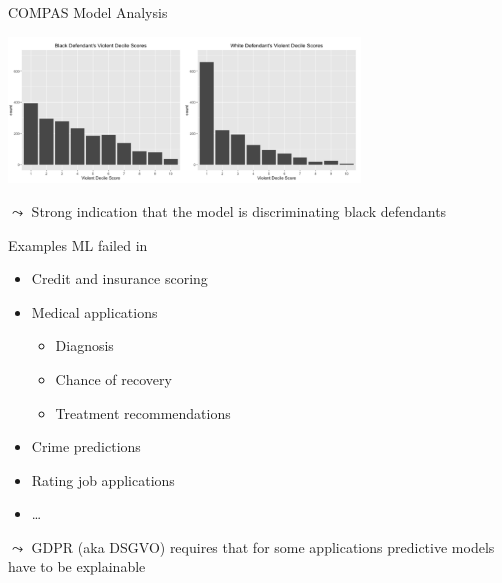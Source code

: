\documentclass[11pt,compress,t,notes=noshow, aspectratio=169, xcolor=table]{beamer}
\begin{document}
\begin{frame}{COMPAS Model Analysis~}
    
    \centering
    \includegraphics[width=0.7\textwidth]{figure/compass_black_white.PNG}
	
	$\leadsto$ Strong indication that the model is discriminating black defendants
	
\end{frame}

\begin{frame}{Examples ML failed in}

    \begin{itemize}
        \item Credit and insurance scoring
        
        \item Medical applications
        \begin{itemize}
            \item Diagnosis
            \item Chance of recovery
            \item Treatment recommendations
        \end{itemize}
        
        \item Crime predictions
        
        \item Rating job applications
        
        \item \ldots
    \end{itemize}

    
    \bigskip

    $\leadsto$ GDPR (aka DSGVO) requires that for some applications predictive models have to be explainable        
	
\end{frame}
\end{document}

